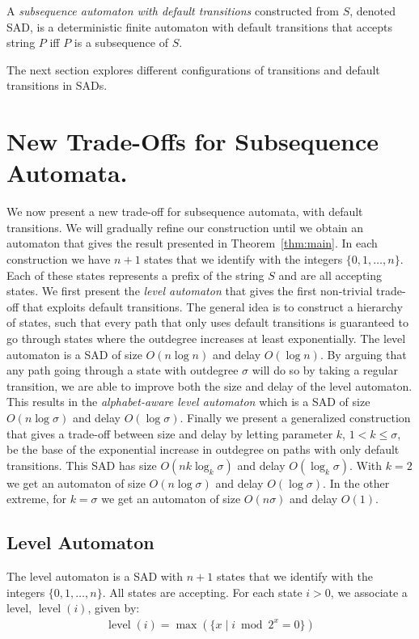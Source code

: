 \documentclass[a4paper,11pt]{article}
\DeclareMathOperator{\level}{level}
\begin{document}
A \emph{subsequence automaton with default transitions} constructed from $S$, denoted SAD, is a deterministic finite automaton with default transitions that accepts string $P$ iff $P$ is a subsequence of $S$. 

The next section explores different configurations of transitions and default transitions in SADs.















\section{New Trade-Offs for Subsequence Automata.}
We now present a new trade-off for subsequence automata, with default transitions. We will gradually refine our construction until we obtain an automaton that gives the result presented in Theorem~\ref{thm:main}. In each construction we have $n+1$ states that we identify with the integers $\{0,1, \ldots, n\}$. Each of these states represents a prefix of the string $S$ and are all accepting states.
We first present the \emph{level automaton} that gives the first non-trivial trade-off that exploits default transitions. 
The general idea is to construct a hierarchy of states, such that every path that only uses default transitions is guaranteed to go through states where the outdegree increases at least exponentially.
The level automaton is a SAD of size $O(n\log n)$ and delay $O(\log n)$. 
By arguing that any path going through a state with outdegree $\sigma$ will do so by taking a regular transition, we are able to improve both the size and delay of the level automaton. 
This results in the \emph{alphabet-aware level automaton} which is a SAD of size $O(n\log \sigma)$ and delay $O(\log \sigma)$. Finally we present a generalized  construction that gives a trade-off between size and delay by letting parameter $k$, $1 < k \leq \sigma$, be the base of the exponential increase in outdegree on paths with only default transitions. This SAD has size $O(nk\log_k \sigma)$ and delay $O(\log_k \sigma)$. With $k=2$ we get an automaton of size $O(n\log \sigma)$ and delay $O(\log \sigma)$. In the other extreme, for $k=\sigma$ we get an automaton of size $O(n\sigma)$ and delay $O(1)$.
\subsection{Level Automaton}
The level automaton is a SAD with $n+1$ states that we identify with the integers $\{0,1, \ldots, n\}$. All states are accepting. For each state $i>0$, we associate a level, $\level(i)$, given by:
\begin{gather*}
\level(i) =\max(\{x \;|\; i \bmod 2^x = 0 \})
\end{gather*}
\end{document}
